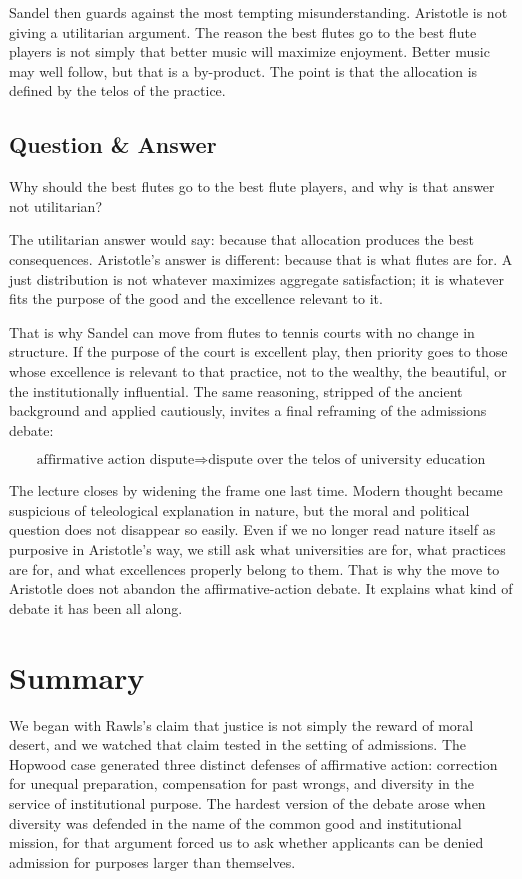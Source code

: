 Sandel then guards against the most tempting misunderstanding. Aristotle is not giving a utilitarian argument. The reason the best flutes go to the best flute players is not simply that better music will maximize enjoyment. Better music may well follow, but that is a by-product. The point is that the allocation is defined by the telos of the practice.

\subsection{Question \& Answer}

Why should the best flutes go to the best flute players, and why is that answer not utilitarian?

The utilitarian answer would say: because that allocation produces the best consequences. Aristotle's answer is different: because that is what flutes are for. A just distribution is not whatever maximizes aggregate satisfaction; it is whatever fits the purpose of the good and the excellence relevant to it.

That is why Sandel can move from flutes to tennis courts with no change in structure. If the purpose of the court is excellent play, then priority goes to those whose excellence is relevant to that practice, not to the wealthy, the beautiful, or the institutionally influential. The same reasoning, stripped of the ancient background and applied cautiously, invites a final reframing of the admissions debate:

\begin{equation}
\text{affirmative action dispute}
\Longrightarrow
\text{dispute over the telos of university education}
\end{equation}

The lecture closes by widening the frame one last time. Modern thought became suspicious of teleological explanation in nature, but the moral and political question does not disappear so easily. Even if we no longer read nature itself as purposive in Aristotle's way, we still ask what universities are for, what practices are for, and what excellences properly belong to them. That is why the move to Aristotle does not abandon the affirmative-action debate. It explains what kind of debate it has been all along.

\section{Summary}

We began with Rawls's claim that justice is not simply the reward of moral desert, and we watched that claim tested in the setting of admissions. The Hopwood case generated three distinct defenses of affirmative action: correction for unequal preparation, compensation for past wrongs, and diversity in the service of institutional purpose. The hardest version of the debate arose when diversity was defended in the name of the common good and institutional mission, for that argument forced us to ask whether applicants can be denied admission for purposes larger than themselves.

